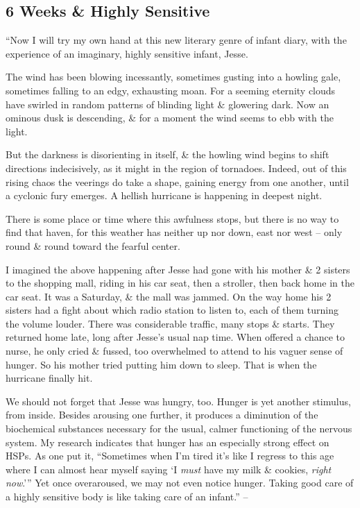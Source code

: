 \documentclass{article}
\numberwithin{equation}{section}
\begin{document}
\subsection{6 Weeks \& Highly Sensitive}
``Now I will try my own hand at this new literary genre of infant diary, with the experience of an imaginary, highly sensitive infant, Jesse.

The wind has been blowing incessantly, sometimes gusting into a howling gale, sometimes falling to an edgy, exhausting moan. For a seeming eternity clouds have swirled in random patterns of blinding light \& glowering dark. Now an ominous dusk is descending, \& for a moment the wind seems to ebb with the light. 

But the darkness is disorienting in itself, \& the howling wind begins to shift directions indecisively, as it might in the region of tornadoes. Indeed, out of this rising chaos the veerings do take a shape, gaining energy from one another, until a cyclonic fury emerges. A hellish hurricane is happening in deepest night.

There is some place or time where this awfulness stops, but there is no way to find that haven, for this weather has neither up nor down, east nor west -- only round \& round toward the fearful center.

I imagined the above happening after Jesse had gone with his mother \& 2 sisters to the shopping mall, riding in his car seat, then a stroller, then back home in the car seat. It was a Saturday, \& the mall was jammed. On the way home his 2 sisters had a fight about which radio station to listen to, each of them turning the volume louder. There was considerable traffic, many stops \& starts. They returned home late, long after Jesse's usual nap time. When offered a chance to nurse, he only cried \& fussed, too overwhelmed to attend to his vaguer sense of hunger. So his mother tried putting him down to sleep. That is when the hurricane finally hit.

We should not forget that Jesse was hungry, too. Hunger is yet another stimulus, from inside. Besides arousing one further, it produces a diminution of the biochemical substances necessary for the usual, calmer functioning of the nervous system. My research indicates that hunger has an especially strong effect on HSPs. As one put it, ``Sometimes when I'm tired it's like I regress to this age where I can almost hear myself saying `I \textit{must} have my milk \& cookies, \textit{right now}.''' Yet once overaroused, we may not even notice hunger. Taking good care of a highly sensitive body is like taking care of an infant.'' -- \cite[pp. 75--76]{Aron2013}
\end{document}
